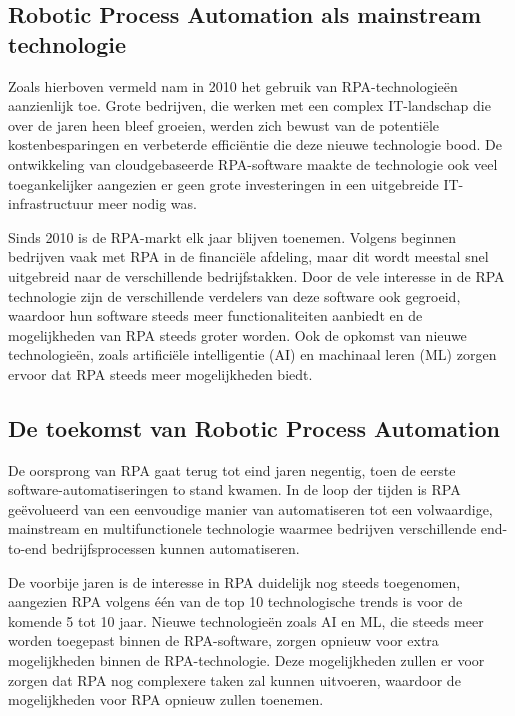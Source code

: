 \subsection{Robotic Process Automation als mainstream technologie}
\label{subsec:rpa-als-mainstream-technologie}

Zoals hierboven vermeld nam in 2010 het gebruik van RPA-technologieën aanzienlijk toe. Grote bedrijven, die werken met een complex IT-landschap die over de jaren heen bleef groeien, werden zich bewust van de potentiële kostenbesparingen en verbeterde efficiëntie die deze nieuwe technologie bood. De ontwikkeling van cloudgebaseerde RPA-software maakte de technologie ook veel toegankelijker aangezien er geen grote investeringen in een uitgebreide IT-infrastructuur meer nodig was.

Sinds 2010 is de RPA-markt elk jaar blijven toenemen. Volgens \textcite{Jiles2020} beginnen bedrijven vaak met RPA in de financiële afdeling, maar dit wordt meestal snel uitgebreid naar de verschillende bedrijfstakken. Door de vele interesse in de RPA technologie zijn de verschillende verdelers van deze software ook gegroeid, waardoor hun software steeds meer functionaliteiten aanbiedt en de mogelijkheden van RPA steeds groter worden. Ook de opkomst van nieuwe technologieën, zoals artificiële intelligentie (AI) en machinaal leren (ML) zorgen ervoor dat RPA steeds meer mogelijkheden biedt.

\subsection{De toekomst van Robotic Process Automation}
\label{subsec:toekomst-van-rpa}

De oorsprong van RPA gaat terug tot eind jaren negentig, toen de eerste software-automatiseringen to stand kwamen. In de loop der tijden is RPA geëvolueerd van een eenvoudige manier van automatiseren tot een volwaardige, mainstream en multifunctionele technologie waarmee bedrijven verschillende end-to-end bedrijfsprocessen kunnen automatiseren.

De voorbije jaren is de interesse in RPA duidelijk nog steeds toegenomen, aangezien RPA volgens \textcite{Laxmikant2023} één van de top 10 technologische trends is voor de komende 5 tot 10 jaar. Nieuwe technologieën zoals AI en ML, die steeds meer worden toegepast binnen de RPA-software, zorgen opnieuw voor extra mogelijkheden binnen de RPA-technologie. Deze mogelijkheden zullen er voor zorgen dat RPA nog complexere taken zal kunnen uitvoeren, waardoor de mogelijkheden voor RPA opnieuw zullen toenemen.

